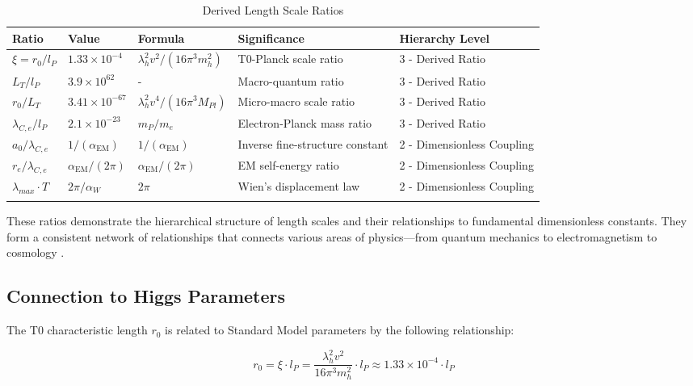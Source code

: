 \documentclass[12pt,a4paper]{article}
\newcommand{\alphaEM}{\alpha_{\text{EM}}}
\begin{document}
	\begin{table}[ht]
		\centering
		\begin{adjustbox}{scale=0.75}
			\begin{tabular}{lllll}
				\hline
				\textbf{Ratio} & \textbf{Value} & \textbf{Formula} & \textbf{Significance} & \textbf{Hierarchy Level} \\
				\hline
				$\xi = r_0/l_P$ & $1.33 \times 10^{-4}$ & $\lambda_h^2v^2/(16\pi^3m_h^2)$ & T0-Planck scale ratio & 3 - Derived Ratio \\
				$L_T/l_P$ & $3.9 \times 10^{62}$ & - & Macro-quantum ratio & 3 - Derived Ratio \\
				$r_0/L_T$ & $3.41 \times 10^{-67}$ & $\lambda_h^2v^4/(16\pi^3M_{Pl})$ & Micro-macro scale ratio & 3 - Derived Ratio \\
				$\lambda_{C,e}/l_P$ & $2.1 \times 10^{-23}$ & $m_P/m_e$ & Electron-Planck mass ratio & 3 - Derived Ratio \\
				$a_0/\lambda_{C,e}$ & $1/(\alphaEM)$ & $1/(\alphaEM)$ & Inverse fine-structure constant & 2 - Dimensionless Coupling \\
				$r_e/\lambda_{C,e}$ & $\alphaEM/(2\pi)$ & $\alphaEM/(2\pi)$ & EM self-energy ratio & 2 - Dimensionless Coupling \\
				$\lambda_{max} \cdot T$ & $2\pi/\alpha_W$ & $2\pi$ & Wien’s displacement law & 2 - Dimensionless Coupling \\
				\hline
				\multicolumn{4}{c}{} \\
				\hline
			\end{tabular}
		\end{adjustbox}
		\caption{Derived Length Scale Ratios}
		\label{tab:length_ratios}
	\end{table}
	
	These ratios demonstrate the hierarchical structure of length scales and their relationships to fundamental dimensionless constants. They form a consistent network of relationships that connects various areas of physics—from quantum mechanics to electromagnetism to cosmology \cite{pascher_planck_2025}.
	
	\subsection{Connection to Higgs Parameters}
	
	The T0 characteristic length $r_0$ is related to Standard Model parameters by the following relationship:
	
	\begin{equation}
		r_0 = \xi \cdot l_P = \frac{\lambda_h^2v^2}{16\pi^3m_h^2} \cdot l_P \approx 1.33 \times 10^{-4} \cdot l_P
	\end{equation}
	
\end{document}
